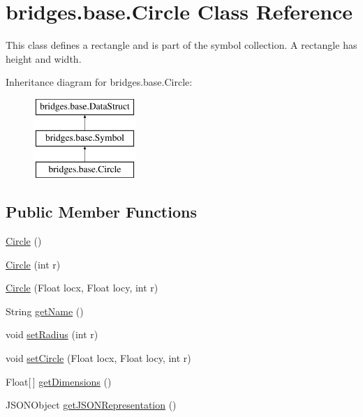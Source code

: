 \hypertarget{classbridges_1_1base_1_1_circle}{}\section{bridges.\+base.\+Circle Class Reference}
\label{classbridges_1_1base_1_1_circle}


This class defines a rectangle and is part of the symbol collection. A rectangle has height and width.  


Inheritance diagram for bridges.\+base.\+Circle\+:\begin{figure}[H]
\begin{center}
\leavevmode
\includegraphics[height=3.000000cm]{classbridges_1_1base_1_1_circle}
\end{center}
\end{figure}
\subsection*{Public Member Functions}
\begin{DoxyCompactItemize}
\item 
\hyperlink{classbridges_1_1base_1_1_circle_a807231dff01120041d7d209d049e3029}{Circle} ()
\item 
\hyperlink{classbridges_1_1base_1_1_circle_abfd82d0ca10193a51234657253051beb}{Circle} (int r)
\item 
\hyperlink{classbridges_1_1base_1_1_circle_a5c7d699257b3e67ac7a3c52e9f05b376}{Circle} (Float locx, Float locy, int r)
\item 
String \hyperlink{classbridges_1_1base_1_1_circle_a3782ea68f0419747c00bd8b2bfa31462}{get\+Name} ()
\item 
void \hyperlink{classbridges_1_1base_1_1_circle_a2587268c948c5e65dd35d4803d133fb1}{set\+Radius} (int r)
\item 
void \hyperlink{classbridges_1_1base_1_1_circle_ab8c228507cbf3067c40d74e35563d1cf}{set\+Circle} (Float locx, Float locy, int r)
\item 
Float\mbox{[}$\,$\mbox{]} \hyperlink{classbridges_1_1base_1_1_circle_af16fe10d1dc5bbac325284f91e66b42a}{get\+Dimensions} ()
\item 
J\+S\+O\+N\+Object \hyperlink{classbridges_1_1base_1_1_circle_ad6a8b8e2dca562fd3fa5254ee861ed70}{get\+J\+S\+O\+N\+Representation} ()
\end{DoxyCompactItemize}
